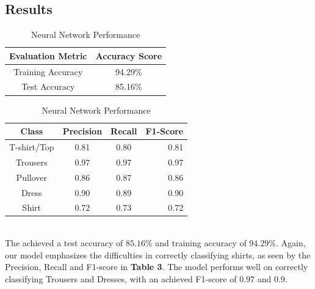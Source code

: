 \subsection{Results}

\begin{table}[!ht]
\begin{subtable}[c]{0.4\textwidth}
\footnotesize
\centering
\begin{tabular}{ c | c }
 \toprule
 Evaluation Metric & Accuracy Score  \\
 \midrule
 Training Accuracy & 94.29\% \\
 Test Accuracy & 85.16\% \\
 \bottomrule
\end{tabular}
\captionsetup{justification=centering,margin=1cm}
\end{subtable}
\begin{subtable}[c]{0.6\textwidth}
\footnotesize
\centering
\begin{tabular}{c | c c r}
Class & Precision & Recall & F1-Score\\
\midrule
T-shirt/Top   &    0.81  &    0.80  &    0.81 \\
Trousers   &    0.97  &    0.97  &    0.97 \\
Pullover   &    0.86  &    0.87  &    0.86\\
Dress   &    0.90  &    0.89  &    0.90\\
Shirt   &    0.72  &    0.73  &    0.72\\
\end{tabular}
\captionsetup{justification=centering,margin=1cm}
\end{subtable}
\caption{Neural Network Performance}
\label{nn_evaluation}
\end{table}\\

The  achieved a test accuracy of $85.16\%$ and training accuracy of $94.29\%$.
Again, our model emphasizes the difficulties in correctly classifying shirts, as seen by the Precision, Recall and F1-score in \textbf{Table 3}.
The model performs well on correctly classifying Trousers and Dresses, with an achieved F1-score of 0.97 and 0.9.







